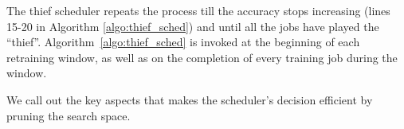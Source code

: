 The thief scheduler repeats the process till the accuracy stops increasing (lines 15-20 in Algorithm \ref{algo:thief_sched}) and until all the jobs have played the ``thief''. 
Algorithm~\ref{algo:thief_sched} is invoked at the beginning of each retraining window, as well as on the completion of every training job during the window.%






    

    




We call out the key aspects that makes the scheduler's decision efficient by pruning the search space. %

